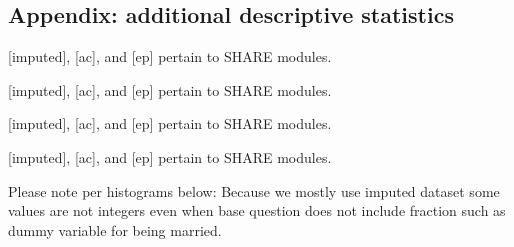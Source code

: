 \documentclass[10pt, letterpaper]{article}
\begin{document}
\begin{spacing}{1.4}






\begin{spacing}{.9}

\section{Appendix: additional descriptive statistics}

 
{\footnotesize [imputed], [ac], and [ep] pertain to SHARE modules.}
 
{\footnotesize [imputed], [ac], and [ep] pertain to SHARE modules.}
 
{\footnotesize [imputed], [ac], and [ep] pertain to SHARE modules.}
 
{\footnotesize [imputed], [ac], and [ep] pertain to SHARE modules.}

\vspace{.2in}

Please note per histograms below: Because we mostly use imputed dataset some values are not integers even when base
question does not include fraction such as dummy variable for being married. 









\end{spacing}
\end{spacing}
\end{document}
